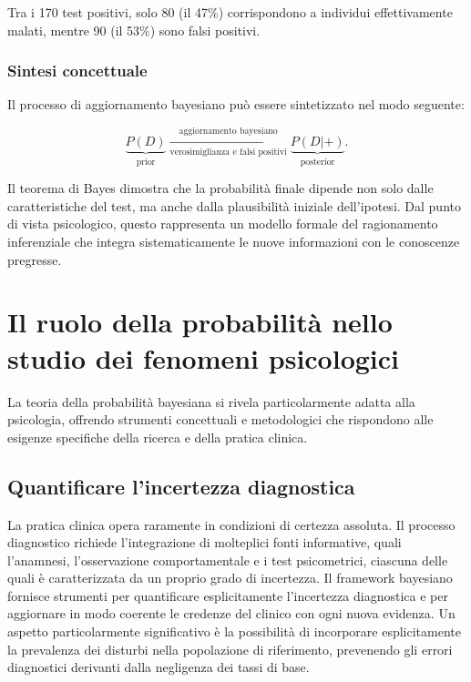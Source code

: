 \documentclass[
  letterpaper,
  DIV=11,
  numbers=noendperiod,
  oneside]{scrreprt}
\theoremstyle{definition}
\theoremstyle{plain}
\theoremstyle{definition}
\theoremstyle{remark}
\begin{document}
Tra i 170 test positivi, solo 80 (il 47\%) corrispondono a individui
effettivamente malati, mentre 90 (il 53\%) sono falsi positivi.

\subsubsection{Sintesi concettuale}\label{sintesi-concettuale}

Il processo di aggiornamento bayesiano può essere sintetizzato nel modo
seguente:

\[
\underbrace{P(D)}_{\text{prior}} \xrightarrow[\text{verosimiglianza e falsi positivi}]{\text{aggiornamento bayesiano}} \underbrace{P(D|+)}_{\text{posterior}}.
\]

Il teorema di Bayes dimostra che la probabilità finale dipende non solo
dalle caratteristiche del test, ma anche dalla plausibilità iniziale
dell'ipotesi. Dal punto di vista psicologico, questo rappresenta un
modello formale del ragionamento inferenziale che integra
sistematicamente le nuove informazioni con le conoscenze pregresse.

\section{Il ruolo della probabilità nello studio dei fenomeni
psicologici}\label{il-ruolo-della-probabilituxe0-nello-studio-dei-fenomeni-psicologici}

La teoria della probabilità bayesiana si rivela particolarmente adatta
alla psicologia, offrendo strumenti concettuali e metodologici che
rispondono alle esigenze specifiche della ricerca e della pratica
clinica.

\subsection{Quantificare l'incertezza
diagnostica}\label{quantificare-lincertezza-diagnostica}

La pratica clinica opera raramente in condizioni di certezza assoluta.
Il processo diagnostico richiede l'integrazione di molteplici fonti
informative, quali l'anamnesi, l'osservazione comportamentale e i test
psicometrici, ciascuna delle quali è caratterizzata da un proprio grado
di incertezza. Il framework bayesiano fornisce strumenti per
quantificare esplicitamente l'incertezza diagnostica e per aggiornare in
modo coerente le credenze del clinico con ogni nuova evidenza. Un
aspetto particolarmente significativo è la possibilità di incorporare
esplicitamente la prevalenza dei disturbi nella popolazione di
riferimento, prevenendo gli errori diagnostici derivanti dalla
negligenza dei tassi di base.
\end{document}
